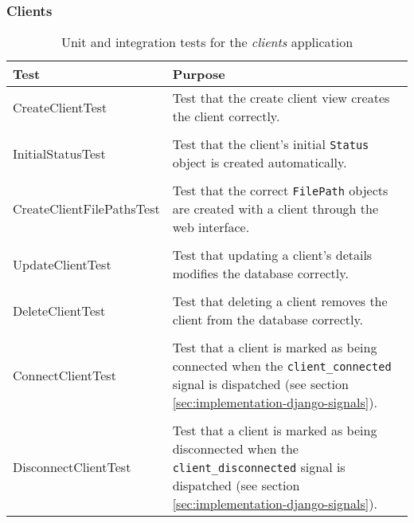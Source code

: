 \subsubsection{Clients}

\begin{table}[H]
    \centering
    \begin{tabular}{ l  p{7cm} }
        \toprule
        Test                        & Purpose
        \\ \midrule
        CreateClientTest            & Test that the create client view creates
                                      the client correctly.
        \\ \\
        InitialStatusTest           & Test that the client's initial
                                      \verb!Status! object is created
                                      automatically.
        \\ \\
        CreateClientFilePathsTest   & Test that the correct \verb!FilePath!
                                      objects are created with a client
                                      through the web interface.
        \\ \\
        UpdateClientTest            & Test that updating a client's details
                                      modifies the database correctly.
        \\ \\
        DeleteClientTest            & Test that deleting a client removes the
                                      client from the database correctly.

        \\ \\
        ConnectClientTest           & Test that a client is marked as being
                                      connected when the
                                      \verb!client_connected! signal is
                                      dispatched (see section
                                      \ref{sec:implementation-django-signals}).
        \\ \\
        DisconnectClientTest        & Test that a client is marked as being
                                      disconnected when the
                                      \verb!client_disconnected! signal is
                                      dispatched (see section
                                      \ref{sec:implementation-django-signals}).
        \\ \bottomrule
    \end{tabular}
    \caption{Unit and integration tests for the \emph{clients} application}
    \label{tab:tests-clients}
\end{table}


